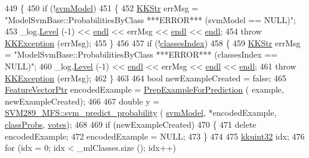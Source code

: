 \begin{DoxyCode}
449 \{
450   \textcolor{keywordflow}{if}  (!\hyperlink{class_k_k_m_l_l_1_1_model_svm_base_a8f6ed793dfaa080ddea8e1776d2ee755}{svmModel})
451   \{
452     \hyperlink{class_k_k_b_1_1_k_k_str}{KKStr} errMsg = \textcolor{stringliteral}{"ModelSvmBase::ProbabilitiesByClass   ***ERROR***      (svmModel == NULL)"};
453     \_log.\hyperlink{class_k_k_b_1_1_run_log_a32cf761d7f2e747465fd80533fdbb659}{Level} (-1) << \hyperlink{namespace_k_k_b_ad1f50f65af6adc8fa9e6f62d007818a8}{endl} << errMsg << \hyperlink{namespace_k_k_b_ad1f50f65af6adc8fa9e6f62d007818a8}{endl} << \hyperlink{namespace_k_k_b_ad1f50f65af6adc8fa9e6f62d007818a8}{endl};
454     \textcolor{keywordflow}{throw} \hyperlink{class_k_k_b_1_1_k_k_exception}{KKException} (errMsg);
455   \}
456 
457   \textcolor{keywordflow}{if}  (!\hyperlink{class_k_k_m_l_l_1_1_model_adbb9475e16bb2c3eef52170485e3018e}{classesIndex})
458   \{
459     \hyperlink{class_k_k_b_1_1_k_k_str}{KKStr} errMsg = \textcolor{stringliteral}{"ModelSvmBase::ProbabilitiesByClass   ***ERROR***      (classesIndex == NULL)"};
460     \_log.\hyperlink{class_k_k_b_1_1_run_log_a32cf761d7f2e747465fd80533fdbb659}{Level} (-1) << \hyperlink{namespace_k_k_b_ad1f50f65af6adc8fa9e6f62d007818a8}{endl} << errMsg << \hyperlink{namespace_k_k_b_ad1f50f65af6adc8fa9e6f62d007818a8}{endl} << \hyperlink{namespace_k_k_b_ad1f50f65af6adc8fa9e6f62d007818a8}{endl};
461     \textcolor{keywordflow}{throw} \hyperlink{class_k_k_b_1_1_k_k_exception}{KKException} (errMsg);
462   \}
463 
464   \textcolor{keywordtype}{bool}  newExampleCreated = \textcolor{keyword}{false};
465   \hyperlink{class_k_k_m_l_l_1_1_feature_vector}{FeatureVectorPtr}  encodedExample = \hyperlink{class_k_k_m_l_l_1_1_model_a31b972adfb64769b3ae966debec824fd}{PrepExampleForPrediction} (
      example, newExampleCreated);
466 
467   \textcolor{keywordtype}{double}  y = \hyperlink{namespace_s_v_m289___m_f_s_ac0623d29bd02989f751e50d1cb3c8855}{SVM289\_MFS::svm\_predict\_probability} (
      \hyperlink{class_k_k_m_l_l_1_1_model_svm_base_a8f6ed793dfaa080ddea8e1776d2ee755}{svmModel},  *encodedExample, \hyperlink{class_k_k_m_l_l_1_1_model_a9d51bc464ab7049659aeea120bf9db26}{classProbs}, \hyperlink{class_k_k_m_l_l_1_1_model_a7d13e2ff97ace39ec4423fd4bfa9ecf2}{votes});
468 
469   \textcolor{keywordflow}{if}  (newExampleCreated)
470   \{
471     \textcolor{keyword}{delete} encodedExample;
472     encodedExample = NULL;
473   \}
474 
475   \hyperlink{namespace_k_k_b_af8d832f05c54994a1cce25bd5743e19a}{kkuint32}  idx;
476   \textcolor{keywordflow}{for}  (idx = 0;  idx < \_mlClasses.size ();  idx++)

\end{DoxyCode}
